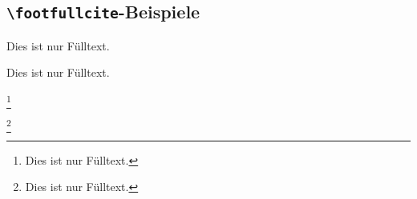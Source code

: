 \documentclass[a4paper]{article}
\newcommand{\cmd}[1]{\texttt{\textbackslash #1}}
\begin{document}
\subsection*{\cmd{footfullcite}-Beispiele}

Dies ist nur Fülltext. 

Dies ist nur Fülltext. 

\footnote{Dies ist nur Fülltext. }

\footnote{Dies ist nur Fülltext. }

\clearpage

\printshorthands

\nocite{*}
\printbibliography[notkeyword=journalnumberdate]
\end{document}
